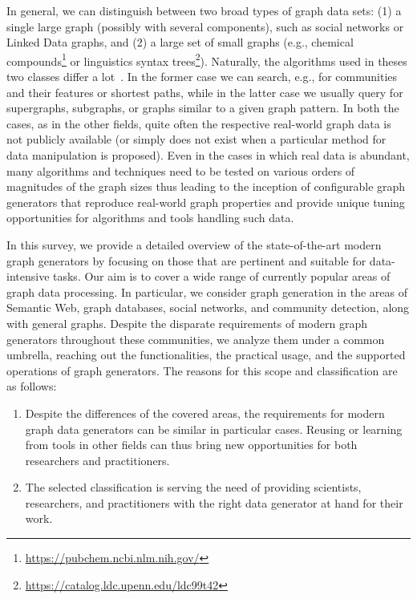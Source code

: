 In general, we can distinguish between two broad types of graph data sets: (1) a single large graph (possibly with several components), such as social networks  or Linked Data graphs, and (2) a large set of small graphs (e.g., chemical compounds\footnote{\url{https://pubchem.ncbi.nlm.nih.gov/}} or linguistics syntax trees\footnote{\url{https://catalog.ldc.upenn.edu/ldc99t42}}). Naturally, the algorithms used in theses two classes differ a lot~\cite{DBLP:books/igi/Sakr2011}. In the former case we can search, e.g., for communities and their features or shortest paths, while in the latter case we usually query for supergraphs, subgraphs, or graphs similar to a given graph pattern. In both the cases, as in the other fields, quite often the respective real-world graph data is not publicly available (or simply does not exist when a particular method for data manipulation is proposed).
Even in the cases in which real data is abundant, many algorithms and techniques need to be tested on various orders of magnitudes of the graph sizes thus leading to the inception of
configurable graph generators that reproduce real-world graph properties and provide unique tuning opportunities for
algorithms and tools handling such data.

In this survey, we provide a detailed overview of the state-of-the-art
modern
graph generators by focusing on those that are pertinent and suitable for
data-intensive tasks. Our aim is to cover a wide range of currently popular
areas of graph data processing. In particular, we consider graph generation
in the areas of Semantic Web, graph databases, social networks, and community detection, along with general graphs. Despite the disparate requirements of modern graph generators throughout these communities, we analyze them under a common umbrella, reaching out the functionalities, the practical usage, and the supported operations of graph generators. The reasons for this scope and classification are as follows:

\begin{enumerate}
  \item Despite the differences of the covered areas, the requirements for
modern graph data generators can be similar in particular cases. Reusing or learning from tools in other fields can thus bring new opportunities for both researchers and practitioners.
  \item The selected classification is serving the need of providing scientists, researchers, and practitioners with the right data generator at hand for their work.
\end{enumerate}

